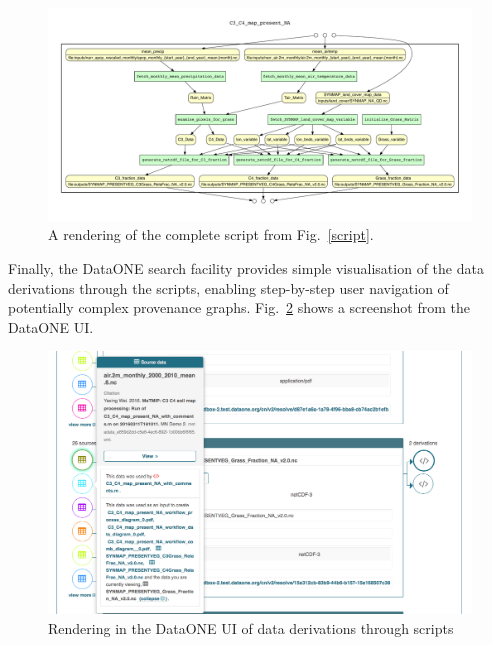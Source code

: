 \documentclass[a4paper]{llncs}
\begin{document}
\begin{figure}
\centering 
\includegraphics[width=\textwidth]{C3_C4_map_present_NA_workflow_comb_diagram} 
\caption{A rendering of the complete script from Fig.~\ref{script}.} 
 \label{yw-graph} 
 \end{figure}

Finally, the DataONE search facility provides simple visualisation of the data derivations through the scripts, enabling step-by-step user navigation of potentially complex provenance graphs. Fig.~\ref{UI} shows a screenshot from the DataONE UI.

\begin{figure}
\centering 
\includegraphics[width=\textwidth]{UI-screenshot-derivations} 
\caption{Rendering in the DataONE UI of data derivations through scripts}
 \label{UI} 
 \end{figure}






\end{document}
